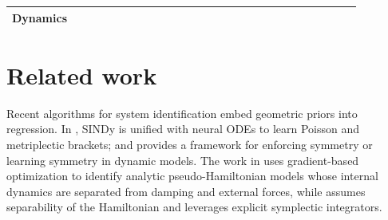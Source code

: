 \documentclass[11pt, a4paper]{article}
\theoremstyle{plain}
\theoremstyle{definition}
\theoremstyle{remark}
\begin{document}
\begin{table}[t]
{\begin{tabular}{
    >{\raggedright\arraybackslash}p{0.15\linewidth} 
    >{\raggedright\arraybackslash}p{0.38\linewidth}
    >{\raggedright\arraybackslash}p{0.34\linewidth}
}
\textbf{Dynamics}
& \makecell[l]{$\displaystyle
\begin{bmatrix}
\dot{\mathbf{q}}\\[2pt]
\dot{\mathbf{p}}
\end{bmatrix}
=
\begin{bmatrix}
\nabla_p \boldsymbol{\Lambda}(\mathbf{z})\\[2pt]
-\nabla_q \boldsymbol{\Lambda}(\mathbf{z})
\end{bmatrix}
\mathbf{a}^{(k)},
$}
& \makecell[l]{$\displaystyle
\begin{bmatrix}
\dot{\mathbf{q}}\\[2pt]
\dot{\mathbf{p}}
\end{bmatrix}
\!=\!
\begin{bmatrix}
\nabla_p \boldsymbol{\Xi}(\mathbf{q},\mathbf{p}) &\! 0 &\! 0\\[2pt]
-\nabla_q \boldsymbol{\Xi}(\mathbf{q},\mathbf{p}) &\! -\dot{\mathbf{Q}} &\! \mathbf{U}
\end{bmatrix}
\!\!\begin{bmatrix}
\mathbf{c}\\[2pt]
\mathbf{r}\\[2pt]
\mathbf{g}
\end{bmatrix}
$} \\

\bottomrule
\end{tabular}}
\vspace{-1em}
\end{table}



\section{Related work}


Recent algorithms for system identification embed geometric priors into regression. In \cite{leeStructurepreservingSparseIdentification2022}, SINDy is unified with neural ODEs to learn Poisson and metriplectic brackets; \cite{chuDiscoveringInterpretableDynamics2020} and \cite{otto2025unified} provides a framework for enforcing symmetry or learning symmetry in dynamic models. The work in \cite{holmsenPseudoHamiltonianSystemIdentification2024} uses gradient-based optimization to identify analytic pseudo-Hamiltonian models whose internal dynamics are separated from damping and external forces, while \cite{dipietroSparseSymplecticallyIntegrated2020} assumes separability of the Hamiltonian and leverages explicit symplectic integrators.
\end{document}
